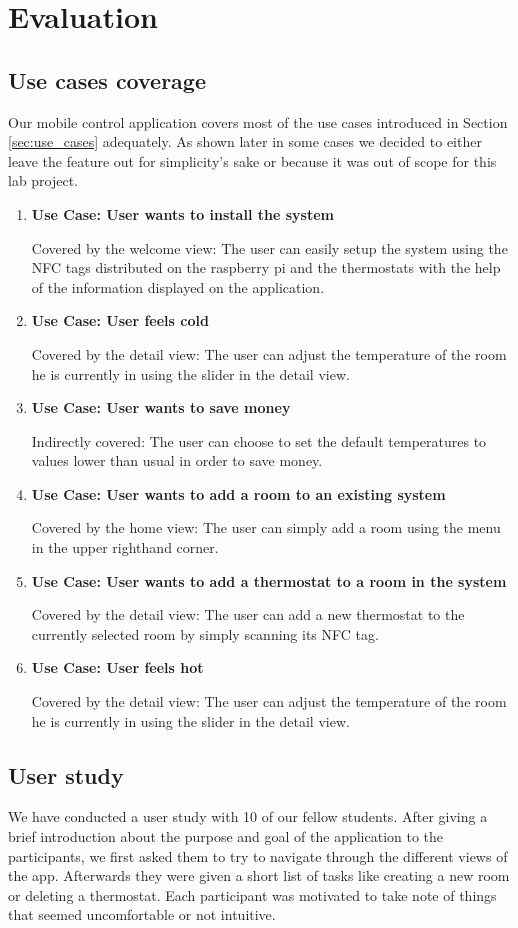 \section{Evaluation}

\subsection {Use cases coverage}
Our mobile control application covers most of the use cases introduced in Section \ref{sec:use_cases} adequately. As shown later in some cases we decided to either leave the feature out for simplicity's sake or because it was out of scope for this lab project.

\begin{enumerate}
\item \textbf{Use Case: User wants to install the system}

Covered by the welcome view: The user can easily setup the system using the NFC tags distributed on the raspberry pi and the thermostats with the help of the information displayed on the application.
\item \textbf{Use Case: User feels cold}

Covered by the detail view: The user can adjust the temperature of the room he is currently in using the slider in the detail view.
\item \textbf{Use Case: User wants to save money}

Indirectly covered: The user can choose to set the default temperatures to values lower than usual in order to save money.
\item \textbf{Use Case: User wants to add a room to an existing system}

Covered by the home view: The user can simply add a room using the menu in the upper righthand corner.
\item \textbf{Use Case: User wants to add a thermostat to a room in the system}

Covered by the detail view: The user can add a new thermostat to the currently selected room by simply scanning its NFC tag.
\item \textbf{Use Case: User feels hot}

Covered by the detail view: The user can adjust the temperature of the room he is currently in using the slider in the detail view.
\end{enumerate}

\subsection{User study}
We have conducted a user study with 10 of our fellow students. After giving a brief introduction about the purpose and goal of the application to the participants, we first asked them to try to navigate through the different views of the app. Afterwards they were given a short list of tasks like creating a new room or deleting a thermostat. Each participant was motivated to take note of things that seemed uncomfortable or not intuitive.

